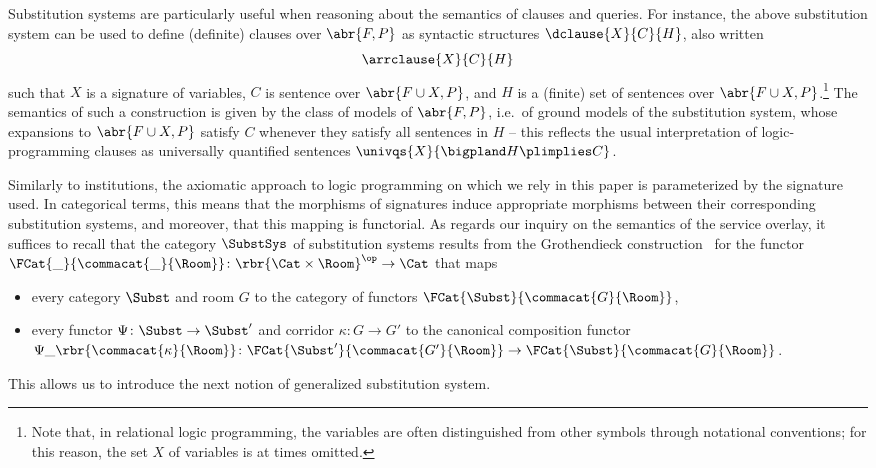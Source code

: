 \documentclass{LMCS}
\begin{document}
  Substitution systems are particularly useful when reasoning about the semantics of clauses and queries.
  For instance, the above substitution system can be used to define (definite) clauses over \(\abr{F, P}\) as syntactic structures \(\dclause{X}{C}{H}\), also written
  \[
  \arrclause{X}{C}{H}
  \]
  such that \(X\) is a signature of variables, \(C\) is sentence over \(\abr{F \cup X, P}\), and \(H\) is a (finite) set of sentences over \(\abr{F \cup X, P}\).\footnote{Note that, in relational logic programming, the variables are often distinguished from other symbols through notational conventions; for this reason, the set \(X\) of variables is at times omitted.}
  The semantics of such a construction is given by the class of models of \(\abr{F, P}\), i.e.\ of ground models of the substitution system, whose expansions to \(\abr{F \cup X, P}\) satisfy \(C\) whenever they satisfy all sentences in \(H\) -- this reflects the usual interpretation of logic-programming clauses as universally quantified sentences \(\univqs{X}{\bigpland H \plimplies C}\).

  Similarly to institutions, the axiomatic approach to logic programming on which we rely in this paper is parameterized by the signature used.
  In categorical terms, this means that the morphisms of signatures induce appropriate morphisms between their corresponding substitution systems, and moreover, that this mapping is functorial.
  As regards our inquiry on the semantics of the service overlay, it suffices to recall that the category \(\SubstSys\) of substitution systems results from the Grothendieck construction~\cite{Tarlecki-Burstall-Goguen:Fundamental-algebraic-tools-III-1991} for the functor \(\FCat{\_}{\commacat{\_}{\Room}} \colon \rbr{\Cat \times \Room}^{\op} \to \Cat\) that maps
  \begin{itemize}

  \item every category \(\Subst\) and room \(G\) to the category of functors \(\FCat{\Subst}{\commacat{G}{\Room}}\),

  \item every functor \(\Psi \colon \Subst \to \Subst'\) and corridor \(\kappa \colon G \to G'\) to the canonical composition functor 
    \(\Psi \_ \rbr{\commacat{\kappa}{\Room}} \colon \FCat{\Subst'}{\commacat{G'}{\Room}} \to \FCat{\Subst}{\commacat{G}{\Room}}\).

  \end{itemize}
  This allows us to introduce the next notion of generalized substitution system.
\end{document}
